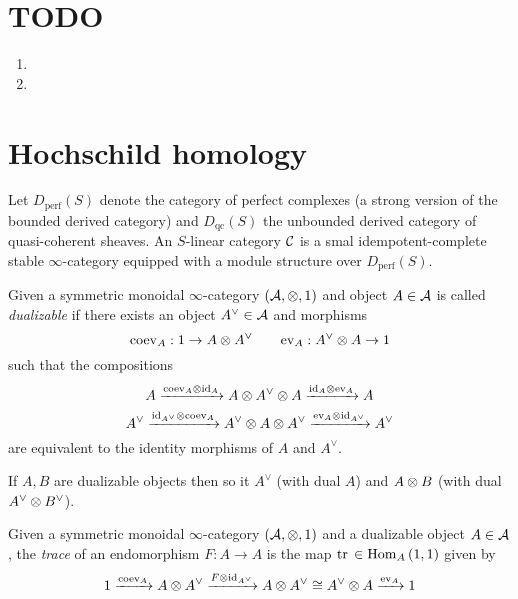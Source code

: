\documentclass[12pt]{article}
\begin{document}
\section{TODO}

\begin{enumerate}
\item {}

\item 
\end{enumerate}

\section{Hochschild homology}

\newcommand{\coev}{\mathrm{coev}}
\newcommand{\xar}[1]{\xrightarrow{#1}}
\newcommand{\perf}{\mathrm{perf}}

\newcommand{\Fun}{\mathrm{Fun}}
\newcommand{\qc}{\mathrm{qc}}
\newcommand{\cHH}{\mathcal{HH}}

Let $D_{\perf}(S)$ denote the category of perfect complexes (a strong version of the bounded derived category) and $D_{\qc}(S)$ the unbounded derived category of quasi-coherent sheaves. An $S$-linear category $\mathcal{C}$ is a smal idempotent-complete stable $\infty$-category equipped with a module structure over $D_{\perf}(S)$. 

\begin{defn}
Given a symmetric monoidal $\infty$-category $(\mathcal{A}, \otimes, 1)$ and object $A \in \mathcal{A}$ is called \textit{dualizable} if there exists an object $A^{\vee} \in \mathcal{A}$ and morphisms
\[ \coev_{A} : 1 \to A \ot A^{\vee} \quad \quad \ev_{A} : A^{\vee} \ot A \to 1 \]
such that the compositions
\[ A \xar{\coev_A \ot \id_A} A \ot A^{\vee} \ot A \xar{\id_A \ot \ev_A} A \]
\[ A^{\vee} \xrightarrow{\id_{A^{\vee}} \ot \coev_A} A^{\vee} \ot A \ot A^{\vee} \xrightarrow{\ev_A \ot \id_{A^{\vee}}} A^{\vee} \]
are equivalent to the identity morphisms of $A$ and $A^{\vee}$.
\end{defn}

\begin{rmk}
If $A,B$ are dualizable objects then so it $A^{\vee}$ (with dual $A$) and $A \otimes B$ (with dual $A^{\vee} \otimes B^{\vee}$). 
\end{rmk}

Given a symmetric monoidal $\infty$-category $(\mathcal{A}, \otimes, 1)$ and a dualizable object $A \in \mathcal{A}$, the \textit{trace} of an endomorphism $F : A \to A$ is the map $\operatorname{\mathrm{tr}}{} \in \mathrm{Hom}_{A} \left( 1, 1 \right)$ given by
\[ 1 \xar{\coev_A} A \ot A^{\vee} \xar{F \ot \id_{A^{\vee}}} A \ot A^{\vee} \cong A^{\vee} \ot A \xar{\ev_A} 1 \]
\end{document}
